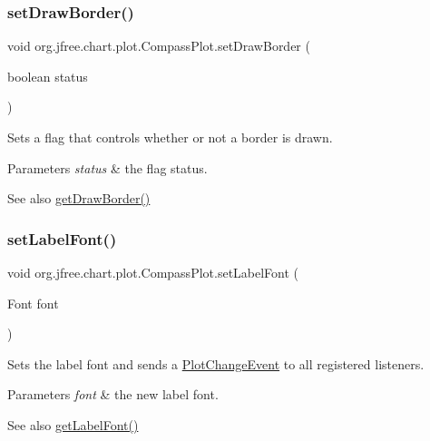 \subsubsection{\texorpdfstring{set\+Draw\+Border()}{setDrawBorder()}}
{\footnotesize\ttfamily void org.\+jfree.\+chart.\+plot.\+Compass\+Plot.\+set\+Draw\+Border (\begin{DoxyParamCaption}\item[{boolean}]{status }\end{DoxyParamCaption})}

Sets a flag that controls whether or not a border is drawn.


\begin{DoxyParams}{Parameters}
{\em status} & the flag status.\\
\hline
\end{DoxyParams}
\begin{DoxySeeAlso}{See also}
\mbox{\hyperlink{classorg_1_1jfree_1_1chart_1_1plot_1_1_compass_plot_a7e539c5097083903be1d9db04a28e5c8}{get\+Draw\+Border()}} 
\end{DoxySeeAlso}
\mbox{\label{classorg_1_1jfree_1_1chart_1_1plot_1_1_compass_plot_af688b26ccadd9c7c02e8976b1f07fa41}} 
\subsubsection{\texorpdfstring{set\+Label\+Font()}{setLabelFont()}}
{\footnotesize\ttfamily void org.\+jfree.\+chart.\+plot.\+Compass\+Plot.\+set\+Label\+Font (\begin{DoxyParamCaption}\item[{Font}]{font }\end{DoxyParamCaption})}

Sets the label font and sends a \mbox{\hyperlink{}{Plot\+Change\+Event}} to all registered listeners.


\begin{DoxyParams}{Parameters}
{\em font} & the new label font.\\
\hline
\end{DoxyParams}
\begin{DoxySeeAlso}{See also}
\mbox{\hyperlink{classorg_1_1jfree_1_1chart_1_1plot_1_1_compass_plot_a0b53e720564c3d6b745d25244fc55752}{get\+Label\+Font()}} 
\end{DoxySeeAlso}
\mbox{\label{classorg_1_1jfree_1_1chart_1_1plot_1_1_compass_plot_a5ab37f95ad344e28b5f78f4d61443b48}} 
